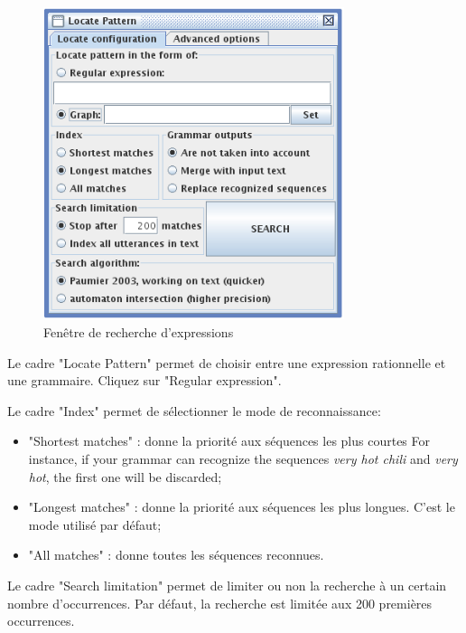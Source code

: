 \bigskip
\begin{figure}[!ht]
\begin{center}
\includegraphics[width=8.8cm]{resources/img/fig4-4.png}
\caption{Fenêtre de recherche d’expressions\label{fig-regexp-search-configuration}}
\end{center}
\end{figure}

\noindent Le cadre "Locate Pattern" permet de choisir entre une expression rationnelle et une
grammaire. Cliquez sur "Regular expression".


\bigskip
\noindent Le cadre "Index" permet de sélectionner le mode de reconnaissance:

\bigskip
{}
\begin{itemize}
  \item "Shortest matches" : donne la priorité aux séquences les plus courtes
  	  For instance, if your grammar can recognize the sequences \textit{very hot chili} and 
  \textit{very hot}, the first one will be discarded;
  \item "Longest matches" : donne la priorité aux séquences les plus longues. C’est le mode utilisé
  	  par défaut;
  \item "All matches" : donne toutes les séquences reconnues.
\end{itemize}

\bigskip
\noindent Le cadre "Search limitation" permet de limiter ou non la recherche à un certain nombre
d’occurrences. Par défaut, la recherche est limitée aux 200 premières occurrences.

